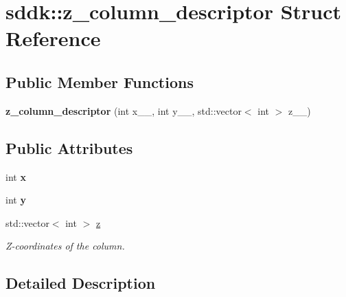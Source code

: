 \hypertarget{structsddk_1_1z__column__descriptor}{}\section{sddk\+:\+:z\+\_\+column\+\_\+descriptor Struct Reference}
\label{structsddk_1_1z__column__descriptor}
\subsection*{Public Member Functions}
\begin{DoxyCompactItemize}
\item 
\hypertarget{structsddk_1_1z__column__descriptor_a7a7e6a642a6d4b676116ef8505a9deee}{}{\bfseries z\+\_\+column\+\_\+descriptor} (int x\+\_\+\+\_\+, int y\+\_\+\+\_\+, std\+::vector$<$ int $>$ z\+\_\+\+\_\+)\label{structsddk_1_1z__column__descriptor_a7a7e6a642a6d4b676116ef8505a9deee}

\end{DoxyCompactItemize}
\subsection*{Public Attributes}
\begin{DoxyCompactItemize}
\item 
\hypertarget{structsddk_1_1z__column__descriptor_a43362f0968086f2690d79b2528d9bb4c}{}int {\bfseries x}\label{structsddk_1_1z__column__descriptor_a43362f0968086f2690d79b2528d9bb4c}

\item 
\hypertarget{structsddk_1_1z__column__descriptor_a9afaffcadf20251d4d179aa1a20bdb91}{}int {\bfseries y}\label{structsddk_1_1z__column__descriptor_a9afaffcadf20251d4d179aa1a20bdb91}

\item 
std\+::vector$<$ int $>$ \hyperlink{structsddk_1_1z__column__descriptor_aa60ceb8eb444412ef771710bbae208fd}{z}
\begin{DoxyCompactList}\small\item\em Z-\/coordinates of the column. \end{DoxyCompactList}\end{DoxyCompactItemize}


\subsection{Detailed Description}


